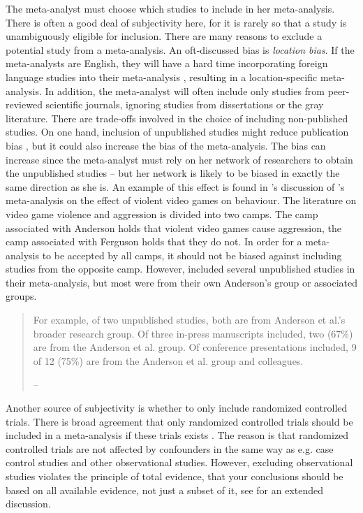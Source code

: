The meta-analyst must choose which studies to include in her meta-analysis. There is often a good deal of subjectivity here, for it is rarely so that a study is unambiguously eligible for inclusion. There are many reasons to exclude a potential study from a meta-analysis. An oft-discussed bias is \emph{location bias}. If the meta-analysts are English, they will have a hard time incorporating foreign language studies into their meta-analysis \parencite{Egger1998-kj}, resulting in a location-specific meta-analysis. In addition, the meta-analyst will often include only studies from peer-reviewed scientific journals, ignoring studies from dissertations or the gray literature. There are trade-offs involved in the choice of including non-published studies. On one hand, inclusion of unpublished studies might reduce publication bias \parencite{Egger1997-ue}, but it could also increase the bias of the meta-analysis. The bias can increase since the meta-analyst must rely on her network of researchers to obtain the unpublished studies -- but her network is likely to be biased in exactly the same direction as she is. An example of this effect is found in \cite{Ferguson2010-to}'s discussion of \cite{Anderson2010-ki}'s meta-analysis on the effect of violent video games on behaviour. The literature on video game violence and aggression is divided into two camps. The camp associated with Anderson holds that violent video games cause aggression, the camp associated with Ferguson holds that they do not. In order for a meta-analysis to be accepted by all camps, it should not be biased against including studies from the opposite camp. However, \cite{Anderson2010-ki} included several unpublished studies in their meta-analysis, but most were from their own Anderson's group or associated groups.
\begin{quote}
For example, of two unpublished studies, both are from Anderson et
al.'s broader research group. Of three in-press manuscripts
included, two (67\%) are from the Anderson et al. group. Of conference
presentations included, 9 of 12 (75\%) are from the Anderson et al.
group and colleagues. 
\begin{flushright}
-- \cite[p. 2]{Ferguson2010-to}
\par\end{flushright}
\end{quote}
Another source of subjectivity is whether to only include randomized controlled trials. There is broad agreement that only randomized controlled trials should be included in a meta-analysis if these trials exists \parencite{Egger1997-ue}. The reason is that randomized controlled trials are not affected by confounders in the same way as e.g. case control studies and other observational studies. However, excluding observational studies violates the principle of total evidence, that your conclusions should be based on all available evidence, not just a subset of it, see \cite{Stegenga2011-zo} for an extended discussion.

